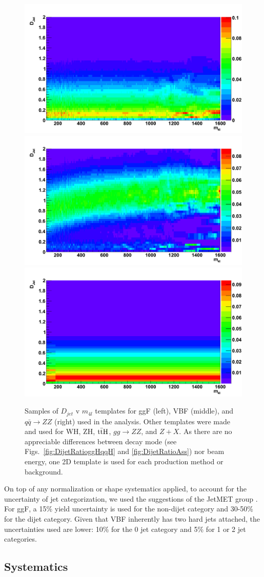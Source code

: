\begin{figure}[htbp]
\begin{center}
\includegraphics[width=.3\linewidth]{HiggsDiscovery/figures/ggH_Fisher_2D.png}
\includegraphics[width=.3\linewidth]{HiggsDiscovery/figures/qqH_Fisher_2D.png}
\includegraphics[width=.3\linewidth]{HiggsDiscovery/figures/qqZZ_Fisher_2D.png} \\
\caption[Templates of $D_jet$ for Signals and Background]{Samples of $D_{jet}$ v $m_{4l}$ templates for ggF (left), VBF (middle), and $q\bar{q}\rightarrow ZZ$ (right) used in the analysis. Other templates were made and used for WH, ZH, $\rm{t\bar{t}H}$, $gg\rightarrow ZZ$, and $Z+X$. As there are no appreciable differences between decay mode (see Figs.~\ref{fig:DijetRatioggHqqH} and \ref{fig:DijetRatioAss}) nor beam energy, one 2D template is used for each production method or background.}
\label{fig:FisherTemplates}
\end{center}
\end{figure}

On top of any normalization or shape systematics applied, to account for the uncertainty of jet categorization, we used the suggestions of the JetMET group \cite{}. For ggF, a 15\% yield uncertainty is used for the non-dijet category and 30-50\% for the dijet category. Given that VBF inherently has two hard jets attached, the uncertainties used are lower: 10\% for the 0 jet category and 5\% for 1 or 2 jet categories.

\subsection{Systematics}
\label{sec:ZZ4lSystematics}

